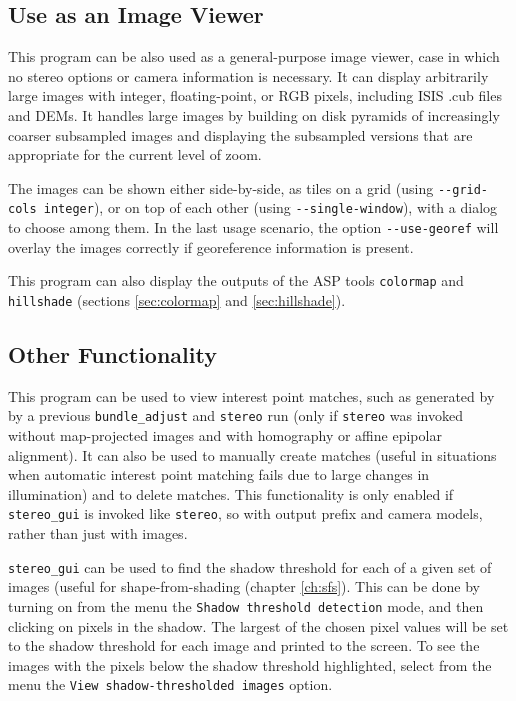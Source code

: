 \subsection{Use as an Image Viewer}

This program can be also used as a general-purpose image viewer, case in
which no stereo options or camera information is necessary.  It can
display arbitrarily large images with integer, floating-point, or RGB
pixels, including ISIS .cub files and DEMs. It handles large images by
building on disk pyramids of increasingly coarser subsampled images and
displaying the subsampled versions that are appropriate for the current
level of zoom.

The images can be shown either side-by-side, as tiles on a grid
(using \texttt{-\/-grid-cols integer}), or on top of each other (using
\texttt{-\/-single-window}), with a dialog to choose among them.  In the
last usage scenario, the option \texttt{-\/-use-georef} will overlay the
images correctly if georeference information is present.

This program can also display the outputs of the ASP tools
\texttt{colormap} and \texttt{hillshade} (sections \ref{sec:colormap}
and \ref{sec:hillshade}).

\subsection{Other Functionality}

This program can be used to view interest point matches, such as generated
by by a previous \texttt{bundle\_adjust} and \texttt{stereo} run (only
if \texttt{stereo} was invoked without map-projected images and with
homography or affine epipolar alignment). It can also be used to
manually create matches (useful in situations when automatic interest
point matching fails due to large changes in illumination) and to delete
matches. This functionality is only enabled if \texttt{stereo\_gui} is
invoked like \texttt{stereo}, so with output prefix and camera models,
rather than just with images.

\texttt{stereo\_gui} can be used to find the shadow threshold for each
of a given set of images (useful for shape-from-shading (chapter \ref{ch:sfs}).
This can be done by turning on from the menu
the \texttt{Shadow threshold detection} mode, and then clicking on
pixels in the shadow. The largest of the chosen pixel values will be set
to the shadow threshold for each image and printed to the screen. To see
the images with the pixels below the shadow threshold highlighted,
select from the menu the \texttt{View shadow-thresholded images} option.

